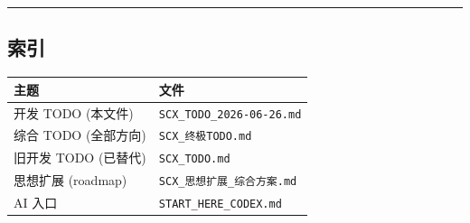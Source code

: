\documentclass[
  12pt,
]{ctexart}
\begin{document}
\begin{center}\rule{0.5\linewidth}{0.5pt}\end{center}

\subsection{索引}\label{ux7d22ux5f15}

\begin{longtable}[]{@{}ll@{}}
\toprule\noalign{}
主题 & 文件 \\
\midrule\noalign{}
\endhead
\bottomrule\noalign{}
\endlastfoot
开发 TODO (本文件) & \texttt{SCX\_TODO\_2026-06-26.md} \\
综合 TODO (全部方向) & \texttt{SCX\_终极TODO.md} \\
旧开发 TODO (已替代) & \texttt{SCX\_TODO.md} \\
思想扩展 (roadmap) & \texttt{SCX\_思想扩展\_综合方案.md} \\
AI 入口 & \texttt{START\_HERE\_CODEX.md} \\
\end{longtable}
\end{document}
